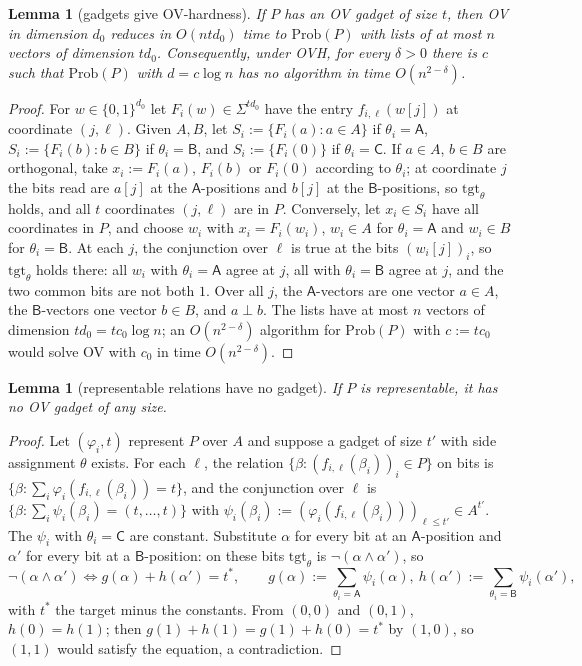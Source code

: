 \documentclass[11pt]{article}
\newtheorem{lemma}[theorem]{Lemma}
\theoremstyle{definition}
\theoremstyle{remark}
\newcommand{\Prob}{\mathrm{Prob}}
\begin{document}
\begin{lemma}[gadgets give OV-hardness]\label{g:lem:gadgethard}
If $P$ has an OV gadget of size $t$, then OV in dimension $d_0$ reduces in $O(ntd_0)$ time to $\Prob(P)$ with lists of at most $n$ vectors of dimension $td_0$. Consequently, under OVH, for every $\delta>0$ there is $c$ such that $\Prob(P)$ with $d=c\log n$ has no algorithm in time $O(n^{2-\delta})$.
\end{lemma}
\begin{proof}
For $w\in\{0,1\}^{d_0}$ let $F_i(w)\in\Sigma^{td_0}$ have the entry $f_{i,\ell}(w[j])$ at coordinate $(j,\ell)$. Given $A,B$, let $S_i:=\{F_i(a):a\in A\}$ if $\theta_i=\mathsf A$, $S_i:=\{F_i(b):b\in B\}$ if $\theta_i=\mathsf B$, and $S_i:=\{F_i(0)\}$ if $\theta_i=\mathsf C$. If $a\in A$, $b\in B$ are orthogonal, take $x_i:=F_i(a)$, $F_i(b)$ or $F_i(0)$ according to $\theta_i$; at coordinate $j$ the bits read are $a[j]$ at the $\mathsf A$-positions and $b[j]$ at the $\mathsf B$-positions, so $\mathrm{tgt}_\theta$ holds, and all $t$ coordinates $(j,\ell)$ are in $P$. Conversely, let $x_i\in S_i$ have all coordinates in $P$, and choose $w_i$ with $x_i=F_i(w_i)$, $w_i\in A$ for $\theta_i=\mathsf A$ and $w_i\in B$ for $\theta_i=\mathsf B$. At each $j$, the conjunction over $\ell$ is true at the bits $(w_i[j])_i$, so $\mathrm{tgt}_\theta$ holds there: all $w_i$ with $\theta_i=\mathsf A$ agree at $j$, all with $\theta_i=\mathsf B$ agree at $j$, and the two common bits are not both $1$. Over all $j$, the $\mathsf A$-vectors are one vector $a\in A$, the $\mathsf B$-vectors one vector $b\in B$, and $a\perp b$. The lists have at most $n$ vectors of dimension $td_0=tc_0\log n$; an $O(n^{2-\delta})$ algorithm for $\Prob(P)$ with $c:=tc_0$ would solve OV with $c_0$ in time $O(n^{2-\delta})$.
\end{proof}

\begin{lemma}[representable relations have no gadget]\label{g:lem:exclusive}
If $P$ is representable, it has no OV gadget of any size.
\end{lemma}
\begin{proof}
Let $(\varphi_i,t)$ represent $P$ over $A$ and suppose a gadget of size $t'$ with side assignment $\theta$ exists. For each $\ell$, the relation $\{\beta:(f_{i,\ell}(\beta_i))_i\in P\}$ on bits is $\{\beta:\sum_i\varphi_i(f_{i,\ell}(\beta_i))=t\}$, and the conjunction over $\ell$ is $\{\beta:\sum_i\psi_i(\beta_i)=(t,\dots,t)\}$ with $\psi_i(\beta_i):=(\varphi_i(f_{i,\ell}(\beta_i)))_{\ell\le t'}\in A^{t'}$. The $\psi_i$ with $\theta_i=\mathsf C$ are constant. Substitute $\alpha$ for every bit at an $\mathsf A$-position and $\alpha'$ for every bit at a $\mathsf B$-position: on these bits $\mathrm{tgt}_\theta$ is $\neg(\alpha\wedge\alpha')$, so
\[
\neg(\alpha\wedge\alpha')\iff g(\alpha)+h(\alpha')=t^*,\qquad g(\alpha):=\sum_{\theta_i=\mathsf A}\psi_i(\alpha),\ h(\alpha'):=\sum_{\theta_i=\mathsf B}\psi_i(\alpha'),
\]
with $t^*$ the target minus the constants. From $(0,0)$ and $(0,1)$, $h(0)=h(1)$; then $g(1)+h(1)=g(1)+h(0)=t^*$ by $(1,0)$, so $(1,1)$ would satisfy the equation, a contradiction.
\end{proof}
\end{document}

